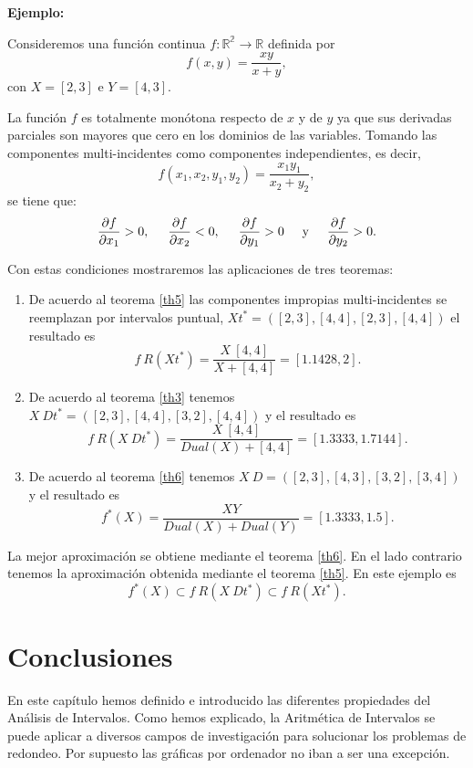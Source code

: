 \textbf{Ejemplo:}

Consideremos una función continua $f : \mathbb{R^2} \to \mathbb{R}$ definida por
$$f(x,y) = \frac{xy}{x+y},$$
con $X = [2,3]$ e $Y = [4,3]$.

La función $f$ es totalmente monótona respecto de $x$ y de $y$ ya que sus derivadas parciales son mayores que cero en los dominios de las variables. Tomando las componentes multi-incidentes como componentes independientes, es decir,
$$f(x_1,x_2,y_1,y_2) = \frac{x_1 y_1}{x_2 + y_2},$$
se tiene que:
$$\frac{\partial f}{\partial x_1} > 0, \hspace{0.5cm} \frac{\partial f}{\partial x_2} < 0, \hspace{0.5cm} \frac{\partial f}{\partial y_1} > 0 \hspace{0.5cm} \text{y} \hspace{0.5cm} \frac{\partial f}{\partial y_2} > 0.$$

Con estas condiciones mostraremos las aplicaciones de tres teoremas:
\begin{enumerate}
\item De acuerdo al teorema \ref{th5} las componentes impropias multi-incidentes se reemplazan por intervalos puntual, $Xt^* = ([2,3],[4,4],[2,3],[4,4])$ el resultado es
$$f \ R(Xt^*) = \frac{X \ [4,4]}{X + [4,4]} = [1.1428,2].$$
\item De acuerdo al teorema \ref{th3} tenemos $X \ Dt^* = ([2,3],[4,4],[3,2],[4,4])$ y el resultado es
$$f \ R(X \ Dt^*) = \frac{X \ [4,4]}{Dual(X) + [4,4]} = [1.3333,1.7144].$$
\item De acuerdo al teorema \ref{th6} tenemos $X \ D = ([2,3],[4,3],[3,2],[3,4])$ y el resultado es
$$f^*(X) = \frac{X Y}{Dual(X) + Dual(Y)} = [1.3333,1.5].$$
\end{enumerate}

La mejor aproximación se obtiene mediante el teorema \ref{th6}. En el lado contrario tenemos la aproximación obtenida mediante el teorema \ref{th5}. En este ejemplo es
$$f^*(X) \subset f \ R(X \ Dt^*) \subset f \ R(Xt^*).$$

\section{Conclusiones}

En este capítulo hemos definido e introducido las diferentes propiedades del Análisis de Intervalos. Como hemos explicado, la Aritmética de Intervalos se puede aplicar a diversos campos de investigación para solucionar los problemas de redondeo. Por supuesto las gráficas por ordenador no iban a ser una excepción.

